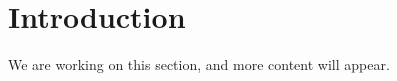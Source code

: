 \section{Introduction}
\begin{publictodo}We are working on this section, and more content will appear.\end{publictodo}
